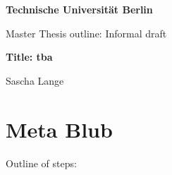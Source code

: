 \documentclass[a4paper, 11pt]{article}
\newcommand{\blatt}{}
\begin{document}
 
	
	\rhead[ \leftmark   ]{\textbf{}}
	\chead[\leftmark   ]{\leftmark{}}
	\lhead[\textbf{}]{\blatt}
	
	
	\thispagestyle{empty}
	\begin{center}
		
		\vspace*{1.4cm}
		{\LARGE \textbf{Technische Universität Berlin}}
		
		\vspace{0.5cm}
		
		{\large Master Thesis outline: Informal draft\\[1mm]}

		
		
		\vspace{1.0cm}
		{\LARGE \textbf{Title: tba}}\\
		\vspace*{1.0cm}
		
	
		Sascha Lange%
		
		
		
	\end{center}
	
	\renewcommand{\labelenumi}{\alph{enumi})}
	\renewcommand{\labelenumii}{(\roman{enumii})}
	\renewcommand{\labelenumiii}{\arabic{enumiii}.}
	\renewcommand{\contentsname}{Table of Contents}
	



	\newpage
	\newtheorem{Cor}{Corollary}
	\newtheorem{Theorem}{Theorem}
	\newtheorem{Def}{Definition}
	\newtheorem{Prop}{Proposition}
	\newtheorem{Lemma}{Lemma}
	\section*{Meta Blub}

Outline of steps:
\end{document}
